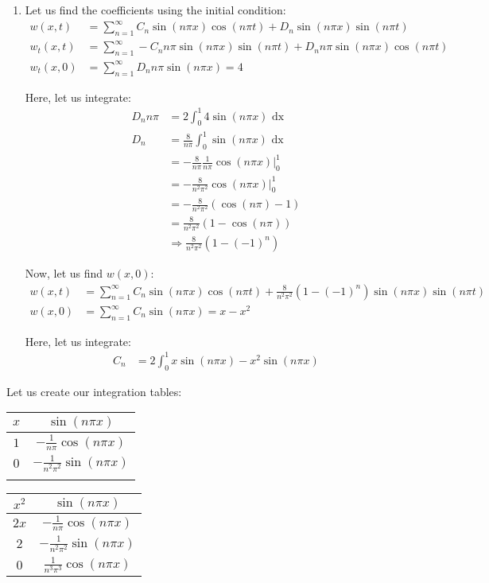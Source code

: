 \begin{enumerate}
  \item Let us find the coefficients using the initial condition:
  \begin{align}
    w(x, t) & = \sum^\infty_{n = 1}
    C_n \sin(n \pi x) \cos(n \pi t) + D_n \sin(n \pi x) \sin(n \pi t)\\
    w_t(x, t) & = \sum^\infty_{n = 1}
    -C_n n \pi \sin(n \pi x) \sin(n \pi t) + D_n n \pi \sin(n \pi x) \cos(n \pi t)\\
    w_t(x, 0) & = \sum^\infty_{n = 1}
    D_n n \pi \sin(n \pi x) = 4
  \end{align}

  Here, let us integrate:
  \begin{align}
    D_n n \pi & = 2 \int^1_0 4 \sin(n \pi x) \text{ dx}\\
    D_n & = \frac{8}{n \pi} \int^1_0 \sin(n \pi x) \text{ dx}\\
    & = - \frac{8}{n \pi} \frac{1}{n \pi} \cos(n \pi x) \Big|^1_0\\
    & = - \frac{8}{n^2 \pi^2} \cos(n \pi x) \Big|^1_0\\
    & = - \frac{8}{n^2 \pi^2} (\cos(n \pi) - 1)\\
    & = \frac{8}{n^2 \pi^2} (1 - \cos(n \pi))\\
    & \Rightarrow \frac{8}{n^2 \pi^2} (1 - (-1)^n)
  \end{align}

  Now, let us find $w(x, 0)$:
  \begin{align}
    w(x, t) & = \sum^\infty_{n = 1} C_n \sin(n \pi x) \cos(n \pi t) + \frac{8}{n^2 \pi^2} (1 - (-1)^n) \sin(n \pi x) \sin(n \pi t)\\
    w(x, 0) & = \sum^\infty_{n = 1} C_n \sin(n \pi x) = x - x^2
  \end{align}

  Here, let us integrate:
  \begin{align}
    C_n & = 2 \int^1_0 x \sin(n \pi x) - x^2 \sin(n \pi x)
  \end{align}
\end{enumerate}

Let us create our integration tables:
%
\begin{center}
  \begin{tabular}{c|c}
    $x$ & $\sin(n \pi x)$\\
    \hline
    $1$ & $-\frac{1}{n \pi} \cos(n \pi x)$\\
    \hline
    $0$ & $-\frac{1}{n^2 \pi^2} \sin(n \pi x)$\\
    &
  \end{tabular}
  \begin{tabular}{c|c}
    $x^2$ & $\sin(n \pi x)$\\
    \hline
    $2x$ & $-\frac{1}{n \pi} \cos(n \pi x)$\\
    \hline
    $2$ & $-\frac{1}{n^2 \pi^2} \sin(n \pi x)$\\
    \hline
    $0$ & $\frac{1}{n^3 \pi^3} \cos(n \pi x)$
  \end{tabular}
\end{center}

